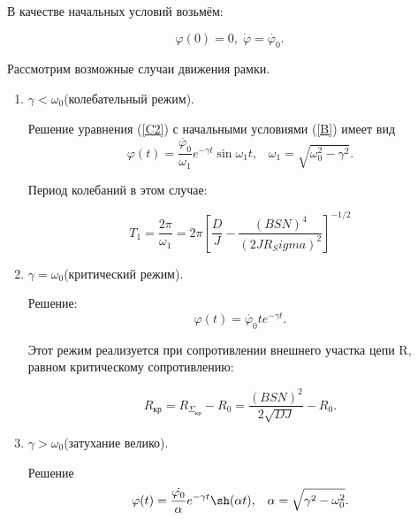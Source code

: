 \documentclass[12pt,a4paper]{article}
\begin{document}
    В качестве начальных условий возьмём:

    \begin{equation}\label{B}
    \varphi(0) = 0,\; \dot{\varphi } = \dot{\varphi_0}.
    \end{equation}
    
    Рассмотрим возможные случаи движения рамки.
    
    \begin{enumerate}
    
        \item $\gamma < \omega_0$(колебательный режим).
    
            Решение уравнения (\ref{C2}) с начальными условиями (\ref{B}) имеет вид
            \begin{equation}
                \varphi \left( t \right) = \frac{\dot{\varphi_0}}{\omega_1} e^{-\gamma t} \sin{\omega_1 t},\;\;\; \omega_1 = \sqrt{\omega_0^2-\gamma^2}.
            \end{equation}
            
            Период колебаний в этом случае:
            
            \begin{equation}
                T_1 = \frac{2\pi}{\omega_1}=2\pi \left[\frac{D}{J}- \frac{\left( BSN \right)^4}{\left( 2 J R_Sigma \right)^2} \right]^{-1/2}
            \end{equation}
        
        \item $\gamma = \omega_0$(критический режим).
        
            Решение:
            \begin{equation}
                \varphi \left( t \right) = \dot{\varphi_0} t e^{-\gamma t}.
            \end{equation}
            
            Этот режим реализуется при сопротивлении внешнего участка цепи R, равном критическому сопротивлению:
            
            \begin{equation}
                R_\text{кр}=R_{\Sigma_\text{кр}}-R_0=\frac{(BSN)^2}{2\sqrt{D J}}-R_0.
            \end{equation}
            
        \item $\gamma > \omega_0$(затухание велико).
        
            Решение
            \begin{equation}
                \varphi (t) = \frac{\dot{\varphi_0}}{\alpha} e^{-\gamma t} \sh (\alpha t), \;\;\; \alpha = \sqrt{\gamma^2-\omega_0^2}.
            \end{equation}
            
    \end{enumerate}
    
\end{document}
